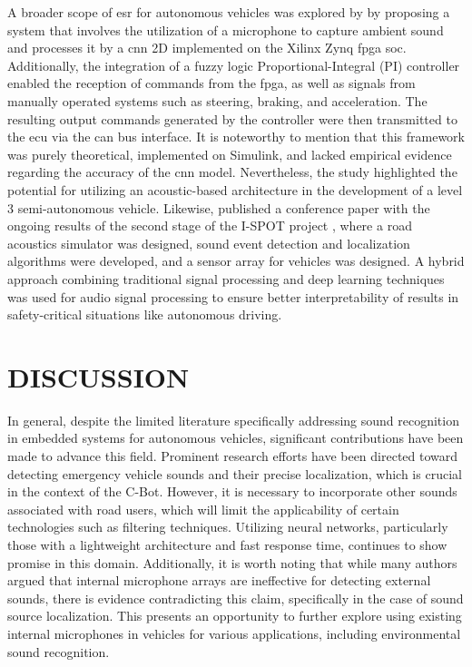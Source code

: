 A broader scope of \gls{esr} for autonomous vehicles was explored by \textcite{Veeraraghavan2020} by proposing a system that involves the utilization of a microphone to capture ambient sound and processes it by a \gls{cnn} 2D implemented on the Xilinx Zynq \gls{fpga} \gls{soc}. Additionally, the integration of a fuzzy logic Proportional-Integral (PI) controller enabled the reception of commands from the \gls{fpga}, as well as signals from manually operated systems such as steering, braking, and acceleration. The resulting output commands generated by the controller were then transmitted to the \gls{ecu} via the \gls{can} bus interface. It is noteworthy to mention that this framework was purely theoretical, implemented on Simulink, and lacked empirical evidence regarding the accuracy of the \gls{cnn} model. Nevertheless, the study highlighted the potential for utilizing an acoustic-based architecture in the development of a level 3 semi-autonomous vehicle. Likewise, \textcite{Yin2023} published a conference paper with the ongoing results of the second stage of the I-SPOT project \cite{ISPOT2020}, where a road acoustics simulator was designed, sound event detection and localization algorithms were developed, and a sensor array for vehicles was designed. A hybrid approach combining traditional signal processing and deep learning techniques was used for audio signal processing to ensure better interpretability of results in safety-critical situations like autonomous driving. 


\section{DISCUSSION}
\label{sec:relt_wrk_discussion}

In general, despite the limited literature specifically addressing sound recognition in embedded systems for autonomous vehicles, significant contributions have been made to advance this field. Prominent research efforts have been directed toward detecting emergency vehicle sounds and their precise localization, which is crucial in the context of the C-Bot. However, it is necessary to incorporate other sounds associated with road users, which will limit the applicability of certain technologies such as filtering techniques. Utilizing neural networks, particularly those with a lightweight architecture and fast response time, continues to show promise in this domain. Additionally, it is worth noting that while many authors argued that internal microphone arrays are ineffective for detecting external sounds, there is evidence contradicting this claim, specifically in the case of sound source localization. This presents an opportunity to further explore using existing internal microphones in vehicles for various applications, including environmental sound recognition.


